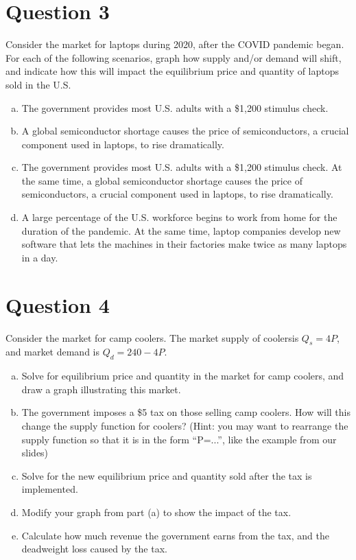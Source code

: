 \documentclass{article}
\newcommand{\question}[1]{\pagebreak\section{Question #1}}
\begin{document}
\pagebreak

\question{3}

Consider the market for laptops during 2020, after the COVID pandemic began. For each of the following scenarios, graph how supply and/or demand will shift, and indicate how this will impact the equilibrium price and quantity of laptops sold in the U.S.

\begin{enumerate}[(a)]
    \item The government provides most U.S. adults with a \$1,200 stimulus check.
    \item A global semiconductor shortage causes the price of semiconductors, a crucial component used in laptops, to rise dramatically.
    \item The government provides most U.S. adults with a \$1,200 stimulus check. At the same time, a global semiconductor shortage causes the price of semiconductors, a crucial component used in laptops, to rise dramatically.
    \item A large percentage of the U.S. workforce begins to work from home for the duration of the pandemic. At the same time, laptop companies develop new software that lets the machines in their factories make twice as many laptops in a day.
\end{enumerate}

\pagebreak

\question{4}

Consider the market for camp coolers. The market supply of coolersis \(Q_s = 4P\), and market demand is \(Q_d = 240 - 4P\).

\begin{enumerate}[(a)]
    \item Solve for equilibrium price and quantity in the market for camp coolers, and draw a graph illustrating this market.
    \item The government imposes a \$5 tax on those selling camp coolers. How will this change the supply function for coolers? (Hint: you may want to rearrange the supply function so that it is in the form “P=...”, like the example from our slides)
    \item Solve for the new equilibrium price and quantity sold after the tax is implemented.
    \item Modify your graph from part (a) to show the impact of the tax.
    \item Calculate how much revenue the government earns from the tax, and the deadweight loss caused by the tax.
\end{enumerate}
\end{document}
